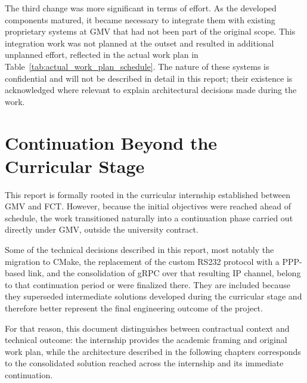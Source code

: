 The third change was more significant in terms of effort. As the developed
components matured, it became necessary to integrate them with existing
proprietary systems at \gls{GMV} that had not been part of the original scope.
This integration work was not planned at the outset and resulted in additional
unplanned effort, reflected in the actual work plan in
Table~\ref{tab:actual_work_plan_schedule}. The nature of these systems is
confidential and will not be described in detail in this report; their
existence is acknowledged where relevant to explain architectural decisions
made during the work.

\section{Continuation Beyond the Curricular Stage}
\label{sec:continuation-context}

This report is formally rooted in the curricular internship established between
\gls{GMV} and \gls{FCT}. However, because the initial objectives were reached
ahead of schedule, the work transitioned naturally into a continuation phase
carried out directly under \gls{GMV}, outside the university contract.

Some of the technical decisions described in this report, most notably the
migration to CMake, the replacement of the custom \gls{RS232} protocol with a
\gls{PPP}-based link, and the consolidation of gRPC over that resulting IP
channel, belong to that continuation period or were finalized there. They are
included because they superseded intermediate solutions developed during the
curricular stage and therefore better represent the final engineering outcome
of the project.

For that reason, this document distinguishes between contractual context and
technical outcome: the internship provides the academic framing and original
work plan, while the architecture described in the following chapters
corresponds to the consolidated solution reached across the internship and its
immediate continuation.
